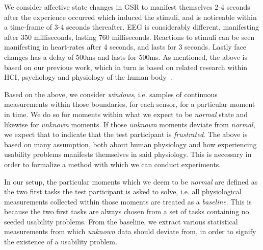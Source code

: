 We consider affective state changes in GSR to manifest themselves 2-4 seconds after the experience occurred which
induced the stimuli, and is noticeable within a time-frame of 3-4 seconds thereafter. EEG is considerably different,
manifesting after 350 milliseconds, lasting 760 milliseconds. Reactions to stimuli can be seen manifesting in heart-rates
after 4 seconds, and lasts for 3 seconds. Lastly face changes has a delay of 500ms and lasts for 500ms. As mentioned,
the above is based on our previous work, which in turn is based on related research within HCI, psychology and
physiology of the human body~\cite{9th_semester_project}.

Based on the above, we consider \textit{windows}, i.e. samples of continuous measurements within those boundaries, for
each sensor, for a particular moment in time. We do so for moments within what we expect to be \textit{normal} state and
likewise for \textit{unknown} moments. If those \textit{unknown} moments deviate from \textit{normal}, we expect that to
indicate that the test participant is \textit{frustrated}. The above is based on many assumption, both about human
physiology and how experiencing usability problems manifests themselves in said physiology. This is necessary in order
to formalize a method with which we can conduct experiments.

In our setup, the particular moments which we deem to be \textit{normal} are defined as the two first tasks the test
participant is asked to solve, i.e. all physiological measurements collected within those moments are treated as a
\textit{baseline}. This is because the two first tasks are always chosen from a set of tasks containing no seeded
usability problems. From the baseline, we extract various statistical measurements from which \textit{unknown} data
should deviate from, in order to signify the existence of a usability problem.


